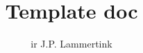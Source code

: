 \newcommand*{\BOOKCLASS}{}


\title{Template doc}
\author{ir J.P. Lammertink}
\maketitle
\tableofcontents



